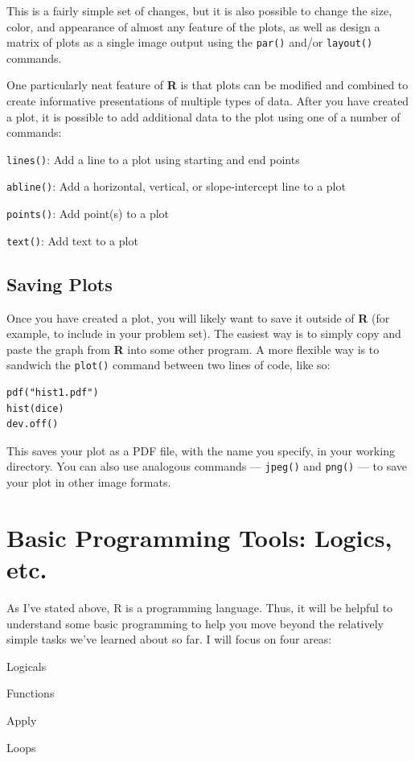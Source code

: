 \documentclass[12pt]{article}\usepackage[]{graphicx}\usepackage[]{color}
\begin{document}
This is a fairly simple set of changes, but it is also possible to change the size, color, and appearance of almost any feature of the plots, as well as design a matrix of plots as a single image output using the \verb|par()| and/or \verb|layout()| commands.

One particularly neat feature of \textbf{R} is that plots can be modified and combined to create informative presentations of multiple types of data. After you have created a plot, it is possible to add additional data to the plot using one of a number of commands:
\begin{itemize*}
\item \verb|lines()|: Add a line to a plot using starting and end points
\item \verb|abline()|: Add a horizontal, vertical, or slope-intercept line to a plot
\item \verb|points()|: Add point(s) to a plot
\item \verb|text()|: Add text to a plot
\end{itemize*}

\subsection{Saving Plots}
Once you have created a plot, you will likely want to save it outside of \textbf{R} (for example, to include in your problem set). The easiest way is to simply copy and paste the graph from \textbf{R} into some other program. A more flexible way is to sandwich the \verb|plot()| command between two lines of code, like so:
\begin{verbatim}
pdf("hist1.pdf")
hist(dice)
dev.off()
\end{verbatim}
This saves your plot as a PDF file, with the name you specify, in your working directory. You can also use analogous commands --- \verb|jpeg()| and \verb|png()| --- to save your plot in other image formats.

\section{Basic Programming Tools: Logics, etc.}\label{sec:programming}
As I've stated above, R is a programming language. Thus, it will be helpful to understand some basic programming to help you move beyond the relatively simple tasks we've learned about so far. I will focus on four areas:
\begin{enumerate*}
\item Logicals
\item Functions
\item Apply
\item Loops
\end{enumerate*}
\end{document}
